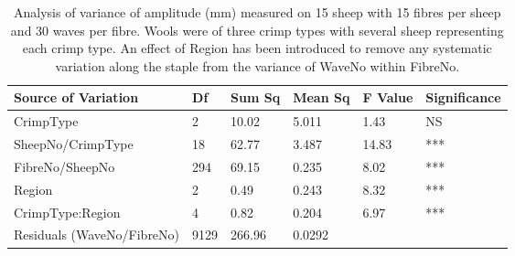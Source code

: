 %

\begin{table}[htp]
\centering
\caption{Analysis of variance of amplitude (mm) measured on 15 sheep with 15 fibres per sheep and 30 waves per fibre. Wools were of three crimp types with several sheep representing each crimp type. An effect of Region has been introduced to remove any systematic variation along the staple from the variance of WaveNo within FibreNo.}
\label{tab:sfamplaovreg}
\vspace{0.1in}
\begin{tabular}{|p{1.4in}|p{0.4in}|p{0.4in}|p{0.4in}|p{0.4in}|p{0.8in}|} \hline
     Source of Variation & Df & Sum Sq  & Mean Sq  & F Value  & Significance  \\  \hline
 CrimpType & 2 & 10.02 & 5.011 & 1.43 & NS  \\
 SheepNo/CrimpType & 18 & 62.77 & 3.487 &  14.83 & ***    \\ 
 FibreNo/SheepNo & 294 & 69.15 & 0.235 & 8.02 & ***  \\
 Region & 2 & 0.49 & 0.243 & 8.32 &  *** \\
 CrimpType:Region & 4 & 0.82 & 0.204 & 6.97 & *** \\
 Residuals (WaveNo/FibreNo) & 9129 & 266.96 & 0.0292 & & \\ \hline
\end{tabular}
\end{table}

%
